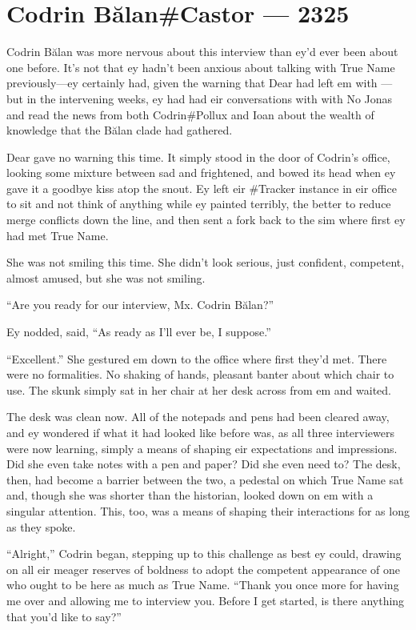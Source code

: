 \hypertarget{codrin-bux103lancastor-2325}{%
\chapter{Codrin Bălan\#Castor — 2325}\label{codrin-bux103lancastor-2325}}

Codrin Bălan was more nervous about this interview than ey'd ever been about one before. It's not that ey hadn't been anxious about talking with True Name previously---ey certainly had, given the warning that Dear had left em with — but in the intervening weeks, ey had had eir conversations with with No Jonas and read the news from both Codrin\#Pollux and Ioan about the wealth of knowledge that the Bălan clade had gathered.

Dear gave no warning this time. It simply stood in the door of Codrin's office, looking some mixture between sad and frightened, and bowed its head when ey gave it a goodbye kiss atop the snout. Ey left eir \#Tracker instance in eir office to sit and not think of anything while ey painted terribly, the better to reduce merge conflicts down the line, and then sent a fork back to the sim where first ey had met True Name.

She was not smiling this time. She didn't look serious, just confident, competent, almost amused, but she was not smiling.

``Are you ready for our interview, Mx. Codrin Bălan?''

Ey nodded, said, ``As ready as I'll ever be, I suppose.''

``Excellent.'' She gestured em down to the office where first they'd met. There were no formalities. No shaking of hands, pleasant banter about which chair to use. The skunk simply sat in her chair at her desk across from em and waited.

The desk was clean now. All of the notepads and pens had been cleared away, and ey wondered if what it had looked like before was, as all three interviewers were now learning, simply a means of shaping eir expectations and impressions. Did she even take notes with a pen and paper? Did she even need to? The desk, then, had become a barrier between the two, a pedestal on which True Name sat and, though she was shorter than the historian, looked down on em with a singular attention. This, too, was a means of shaping their interactions for as long as they spoke.

``Alright,'' Codrin began, stepping up to this challenge as best ey could, drawing on all eir meager reserves of boldness to adopt the competent appearance of one who ought to be here as much as True Name. ``Thank you once more for having me over and allowing me to interview you. Before I get started, is there anything that you'd like to say?''

